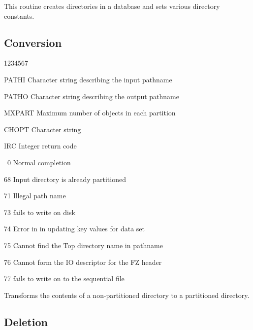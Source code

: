 This routine creates directories in a database and sets various directory
constants.

\subsection{Conversion}


\begin{DLtt}{1234567}
\item[PATHI]Character string describing the input  pathname
\item[PATHO]Character string describing the output pathname
\item[MXPART]Maximum number of objects in each partition
\item[CHOPT]Character string
\item[IRC]Integer return code
  \begin{DLtt}{12}
    \item[\ 0]Normal completion
    \item[68]Input directory is already partitioned
    \item[71]Illegal path name
    \item[73] fails to write on disk
    \item[74]Error in  in updating key values for data set
    \item[75]Cannot find the Top directory name in pathname
    \item[76]Cannot form the IO descriptor for the FZ header
    \item[77] fails to write on to the sequential file
  \end{DLtt}
\end{DLtt}

Transforms the contents of a non-partitioned directory to a
partitioned directory.

\subsection{Deletion}


